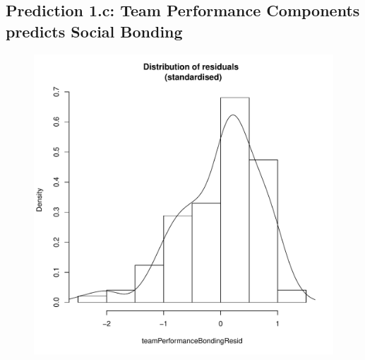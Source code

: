 \begin{CJK}{UTF8}{gbsn}
       \subsection{Prediction 1.c: Team Performance Components predicts Social Bonding\label{app8:prediction1c}}



                


            \begin{figure}[!htbp]
              \includegraphics[scale =.4]{images/MLM3aHist.pdf}

\end{figure}
\end{CJK}
